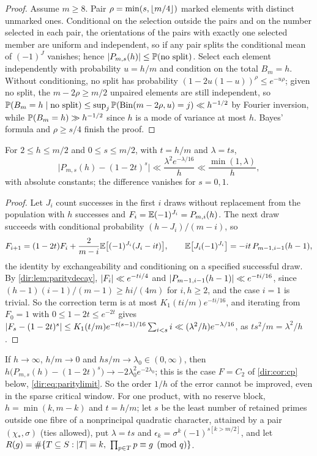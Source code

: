 \begin{proof}
Assume $m\ge8$. Pair $\rho=\min(s,\lfloor m/4\rfloor)$ marked elements with distinct unmarked ones. Conditional on
the selection outside the pairs and on the number selected in each pair, the orientations of the pairs
with exactly one selected member are uniform and independent, so if any pair splits the conditional mean
of $(-1)^J$ vanishes; hence $\lvert P_{m,s}(h)\rvert\le\mathbb{P}(\text{no split})$. Select each element
independently with probability $u=h/m$ and condition on the total $B_m=h$. Without conditioning,
no split has probability $(1-2u(1-u))^\rho\le e^{-u\rho}$; given no split, the $m-2\rho\ge m/2$ unpaired
elements are still independent, so $\mathbb{P}(B_m=h\mid\text{no split})\le\sup_j\mathbb{P}(\mathrm{Bin}(m-2\rho,u)=j)\ll
h^{-1/2}$ by Fourier inversion, while $\mathbb{P}(B_m=h)\gg h^{-1/2}$ since $h$ is a mode of variance at most $h$.
Bayes' formula and $\rho\ge s/4$ finish the proof.
\end{proof}

\begin{theorem}\label{dir:thm:parity}
For $2\le h\le m/2$ and $0\le s\le m/2$, with $t=h/m$ and $\lambda=ts$,
\[
 \bigl|P_{m,s}(h)-(1-2t)^s\bigr|\ll\frac{\lambda^2e^{-\lambda/16}}h\ll\frac{\min(1,\lambda)}h,
\]
with absolute constants; the difference vanishes for $s=0,1$.
\end{theorem}

\begin{proof}
Let $J_i$ count successes in the first $i$ draws without replacement from the population with $h$
successes and $F_i=\mathbb{E}(-1)^{J_i}=P_{m,i}(h)$. The next draw succeeds with conditional probability
$(h-J_i)/(m-i)$, so
\[
 F_{i+1}=(1-2t)F_i+\frac2{m-i}\mathbb{E}\bigl[(-1)^{J_i}(J_i-it)\bigr],\qquad
 \mathbb{E}\bigl[J_i(-1)^{J_i}\bigr]=-it\,P_{m-1,i-1}(h-1),
\]
the identity by exchangeability and conditioning on a specified successful draw. By
\cref{dir:lem:paritydecay}, $\lvert F_i\rvert\ll e^{-ti/4}$ and $\lvert P_{m-1,i-1}(h-1)\rvert\ll e^{-ti/16}$, since
$(h-1)(i-1)/(m-1)\ge hi/(4m)$ for $i,h\ge2$, and the case $i=1$ is trivial. So the correction term is at
most $K_1(ti/m)e^{-ti/16}$, and iterating from $F_0=1$ with $0\le1-2t\le e^{-2t}$ gives
$\lvert F_s-(1-2t)^s\rvert\le K_1(t/m)e^{-t(s-1)/16}\sum_{i<s}i\ll(\lambda^2/h)e^{-\lambda/16}$, as $ts^2/m=\lambda^2/h$.
\end{proof}

If $h\to\infty$, $h/m\to0$ and $hs/m\to\lambda_0\in(0,\infty)$, then
$h\bigl(P_{m,s}(h)-(1-2t)^s\bigr)\to-2\lambda_0^2e^{-2\lambda_0}$; this is the case $F=C_2$ of
\cref{dir:cor:cp} below, \eqref{dir:eq:paritylimit}. So the order $1/h$ of the error cannot be improved,
even in the sparse critical window. For one product,
with no reserve block, $h=\min(k,m-k)$ and $t=h/m$; let $s$ be the least number of retained primes outside
one fibre of a nonprincipal quadratic character, attained by a pair $(\chi_*,\sigma)$ (ties allowed), put
$\lambda=ts$ and $\epsilon_k=\sigma^k(-1)^{s[k>m/2]}$, and let
$R(g)=\#\set{T\subseteq S:\abs T=k,\ \prod_{p\in T}p\equiv g\pmod q}$.

